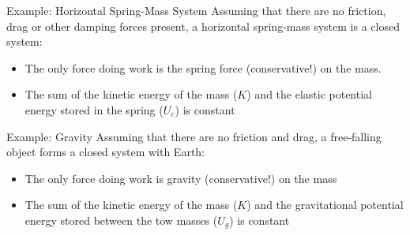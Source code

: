 \documentclass[12pt,compress,aspectratio=169]{beamer}
\begin{document}
\begin{frame}{Example: Horizontal Spring-Mass System}
  Assuming that there are no friction, drag or other damping forces present, a
  horizontal spring-mass system is a closed system:
  \begin{center}
  \end{center}
  \begin{itemize}
  \item The only force doing work is the spring force (conservative!) on the
    mass.
  \item The sum of the kinetic energy of the mass ($K$) and the elastic
    potential energy stored in the spring ($U_e$) is constant

  \end{itemize}
\end{frame}



\begin{frame}{Example: Gravity}
  Assuming that there are no friction and drag, a free-falling object forms a
  closed system with Earth:
  \begin{center}
  \end{center}
  \begin{itemize}
  \item The only force doing work is gravity (conservative!) on the mass
  \item The sum of the kinetic energy of the mass ($K$) and the gravitational
    potential energy stored between the tow masses ($U_g$) is constant
    
  \end{itemize}
\end{frame}
\end{document}

